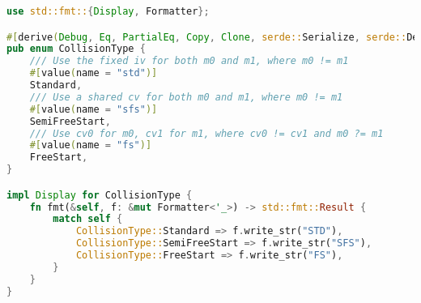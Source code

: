\begin{lstlisting}[language=rust, caption={structs/collision\_type.rs}]
use std::fmt::{Display, Formatter};

#[derive(Debug, Eq, PartialEq, Copy, Clone, serde::Serialize, serde::Deserialize, clap::ValueEnum)]
pub enum CollisionType {
	/// Use the fixed iv for both m0 and m1, where m0 != m1
	#[value(name = "std")]
	Standard,
	/// Use a shared cv for both m0 and m1, where m0 != m1
	#[value(name = "sfs")]
	SemiFreeStart,
	/// Use cv0 for m0, cv1 for m1, where cv0 != cv1 and m0 ?= m1
	#[value(name = "fs")]
	FreeStart,
}

impl Display for CollisionType {
	fn fmt(&self, f: &mut Formatter<'_>) -> std::fmt::Result {
		match self {
			CollisionType::Standard => f.write_str("STD"),
			CollisionType::SemiFreeStart => f.write_str("SFS"),
			CollisionType::FreeStart => f.write_str("FS"),
		}
	}
}
\end{lstlisting}

